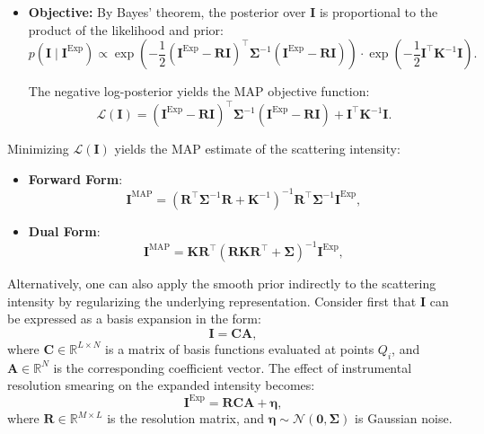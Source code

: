 \documentclass[12pt]{article}
\begin{document}
\begin{itemize}
    \item \textbf{Objective:} By Bayes' theorem, the posterior over \( \mathbf{I} \) is proportional to the product of the likelihood and prior:
    \begin{equation}
        p(\mathbf{I} \mid \mathbf{I}^{\mathrm{Exp}}) \propto 
        \exp\left( -\frac{1}{2} (\mathbf{I}^{\mathrm{Exp}} - \mathbf{R} \mathbf{I})^\top \boldsymbol{\Sigma}^{-1} (\mathbf{I}^{\mathrm{Exp}} - \mathbf{R} \mathbf{I}) \right)
        \cdot \exp\left( -\frac{1}{2} \mathbf{I}^\top \mathbf{K}^{-1} \mathbf{I} \right).
    \end{equation}
    
    The negative log-posterior yields the MAP objective function:
    \begin{equation}
        \mathcal{L}(\mathbf{I}) = 
        (\mathbf{I}^{\mathrm{Exp}} - \mathbf{R} \mathbf{I})^\top \boldsymbol{\Sigma}^{-1} (\mathbf{I}^{\mathrm{Exp}} - \mathbf{R} \mathbf{I})
        + \mathbf{I}^\top \mathbf{K}^{-1} \mathbf{I}.
    \end{equation}
\end{itemize}

Minimizing \( \mathcal{L}(\mathbf{I}) \) yields the MAP estimate of the scattering intensity:

\begin{itemize}
    \item \textbf{Forward Form}:
    \begin{equation}
        \mathbf{I}^{\mathrm{MAP}} = \left( \mathbf{R}^\top \boldsymbol{\Sigma}^{-1} \mathbf{R} + \mathbf{K}^{-1} \right)^{-1} \mathbf{R}^\top \boldsymbol{\Sigma}^{-1} \mathbf{I}^{\mathrm{Exp}},
    \end{equation}

    \item \textbf{Dual Form}:
    \begin{equation}
        \mathbf{I}^{\mathrm{MAP}} = \mathbf{K} \mathbf{R}^\top \left( \mathbf{R} \mathbf{K} \mathbf{R}^\top + \boldsymbol{\Sigma} \right)^{-1} \mathbf{I}^{\mathrm{Exp}},
    \end{equation}
\end{itemize}

Alternatively, one can also apply the smooth prior indirectly to the scattering intensity by regularizing the underlying representation. Consider first that \( \mathbf{I} \) can be expressed as a basis expansion in the form:
\begin{equation}
    \mathbf{I} = \mathbf{C} \mathbf{A},
\end{equation}
where \( \mathbf{C} \in \mathbb{R}^{L \times N} \) is a matrix of basis functions evaluated at points \( Q_i \), and \( \mathbf{A} \in \mathbb{R}^N \) is the corresponding coefficient vector. The effect of instrumental resolution smearing on the expanded intensity becomes:
\begin{equation}
    \mathbf{I}^{\mathrm{Exp}} = \mathbf{R} \mathbf{C} \mathbf{A} + \boldsymbol{\eta},
\end{equation}
where \( \mathbf{R} \in \mathbb{R}^{M \times L} \) is the resolution matrix, and \( \boldsymbol{\eta} \sim \mathcal{N}(\mathbf{0}, \boldsymbol{\Sigma}) \) is Gaussian noise.
\end{document}
